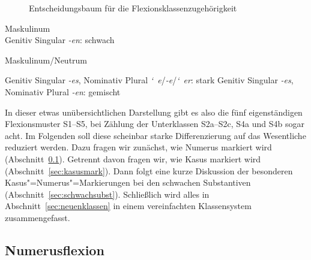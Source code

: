 \begin{figure}[!htbp]
  \centering
  \caption{Entscheidungsbaum für die Flexionsklassenzugehörigkeit}
  \label{fig:substklassentsch}
\end{figure}

\begin{exe}
  \ex\label{ex:wuppdich1} Maskulinum\\
    Genitiv Singular \textit{-en}: schwach


  \ex\label{ex:wuppdich2} Maskulinum\slash Neutrum
  \begin{xlist}
    \ex\label{ex:wuppdich2a} Genitiv Singular \textit{-es}, Nominativ Plural \textit{\char`~e}/\textit{-e}/\textit{\char`~er}: stark
    \ex\label{ex:wuppdich2b} Genitiv Singular \textit{-es}, Nominativ Plural \textit{-en}: gemischt
  \end{xlist}
\end{exe}

In dieser etwas unübersichtlichen Darstellung gibt es also die fünf eigenständigen Flexionsmuster S1--S5, bei Zählung der Unterklassen S2a--S2c, S4a und S4b sogar acht.
Im Folgenden soll diese scheinbar starke Differenzierung auf das Wesentliche reduziert werden.
Dazu fragen wir zunächst, wie Numerus markiert wird (Abschnitt~\ref{sec:pluralmark}).
Getrennt davon fragen wir, wie Kasus markiert wird (Abschnitt~\ref{sec:kasusmark}).
Dann folgt eine kurze Diskussion der besonderen Kasus"=Numerus"=Markierungen bei den schwachen Substantiven (Abschnitt~\ref{sec:schwachsubst}).
Schließlich wird alles in Abschnitt~\ref{sec:neuenklassen} in einem vereinfachten Klassensystem zusammengefasst.


\subsection{Numerusflexion}

\label{sec:pluralmark}

